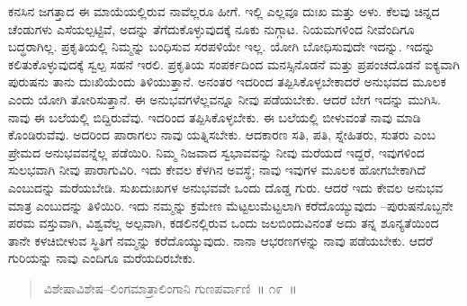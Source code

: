\vspace{0.3cm}

ಕನಸಿನ ಜಗತ್ತಾದ ಈ ಮಾಯೆಯಲ್ಲಿರುವ ನಾವೆಲ್ಲರೂ ಹೀಗೆ. ಇಲ್ಲಿ ಎಲ್ಲವೂ ದುಃಖ ಮತ್ತು ಅಳು. ಕೆಲವು ಚಿನ್ನದ ಚೆಂಡುಗಳು ಎಸೆಯಲ್ಪಟ್ಟಿವೆ, ಅದನ್ನು ತೆಗೆದುಕೊಳ್ಳುವುದಕ್ಕೆ ನೂಕು ನುಗ್ಗಾಟ. ನಿಯಮಗಳಿಂದ ನೀವೆಂದಿಗೂ ಬದ್ಧರಾಗಿಲ್ಲ. ಪ್ರಕೃತಿಯಲ್ಲಿ ನಿಮ್ಮನ್ನು ಬಂಧಿಸುವ ಸರಪಳಿಯೇ ಇಲ್ಲ. ಯೋಗಿ ಬೋಧಿಸುವುದೇ ಇದನ್ನು. ಇದನ್ನು ಕಲಿತುಕೊಳ್ಳುವುದಕ್ಕೆ ಸ್ವಲ್ಪ ಸಹನೆ ಇರಲಿ. ಪ್ರಕೃತಿಯ ಸಂಪರ್ಕದಿಂದ ಮನಸ್ಸಿನೊಡನೆ ಮತ್ತು ಪ್ರಪಂಚದೊಡನೆ ಐಕ್ಯವಾಗಿ ಪುರುಷನು ತಾನು ದುಃಖಿಯೆಂದು ತಿಳಿಯುತ್ತಾನೆ. ಅನಂತರ ಇದರಿಂದ ತಪ್ಪಿಸಿಕೊಳ್ಳಬೇಕಾದರೆ ಅನುಭವದ ಮೂಲಕ ಎಂದು ಯೋಗಿ ತೋರಿಸುತ್ತಾನೆ. ಈ ಅನುಭವಗಳೆಲ್ಲವನ್ನೂ ನೀವು ಪಡೆಯಬೇಕು. ಆದರೆ ಬೇಗ ಇದನ್ನು ಮುಗಿಸಿ. ನಾವು ಈ ಬಲೆಯಲ್ಲಿ ಬಿದ್ದಿರುವೆವು. ಇದರಿಂದ ತಪ್ಪಿಸಿಕೊಳ್ಳಬೇಕು. ಈ ಬಲೆಯಲ್ಲಿ ಬೀಳುವಂತೆ ನಾವು ಮಾಡಿ ಕೊಂಡಿರುವೆವು. ಅದರಿಂದ ಪಾರಾಗಲು ನಾವು ಯತ್ನಿಸಬೇಕು. ಆದಕಾರಣ ಸತಿ, ಪತಿ, ಸ್ನೇಹಿತರು, ಸುತರು ಎಂಬ ಪ್ರೇಮದ ಅನುಭವವನ್ನೆಲ್ಲ ಪಡೆಯಿರಿ. ನಿಮ್ಮ ನಿಜವಾದ ಸ್ವಭಾವವನ್ನು ನೀವು ಮರೆಯದೆ ಇದ್ದರೆ, ಇವುಗಳಿಂದ ಸುಲಭವಾಗಿ ನೀವು ಪಾರಾಗುವಿರಿ. ಇದು ಕೇವಲ ಕೆಳಗಿನ ಅವಸ್ಥೆ; ನಾವು ಇವುಗಳ ಮೂಲಕ ಹೋಗಬೇಕಾಗಿದೆ ಎಂಬುದನ್ನು ಮರೆಯಬೇಡಿ. ಸುಖದುಃಖಗಳ ಅನುಭವವೇ ಒಂದು ದೊಡ್ಡ ಗುರು. ಆದರೆ ಇದು ಕೇವಲ ಅನುಭವ ಮಾತ್ರ ಎಂಬುದನ್ನು ತಿಳಿಯಿರಿ. ಇದು ನಮ್ಮನ್ನು ಕ್ರಮೇಣ ಮೆಟ್ಟಲುಮೆಟ್ಟಲಾಗಿ ಕರೆದೊಯ್ಯುವುದು –ಪುರುಷನೊಬ್ಬನೇ ಪರಮ ವಸ್ತುವಾಗಿ, ವಿಶ್ವವೆಲ್ಲ ಅಲ್ಪವಾಗಿ, ಕಡಲಿನಲ್ಲಿರುವ ಒಂದು ಜಲಬಿಂದುವಿನಂತೆ ಅದು ತನ್ನ ಶೂನ್ಯತೆಯಿಂದ ತಾನೇ ಕಳಚಿಬೀಳುವ ಸ್ಥಿತಿಗೆ ನಮ್ಮನ್ನು ಕರೆದೊಯ್ಯುವುದು. ನಾನಾ ಆಭರಣಗಳನ್ನು ನಾವು ಪಡೆಯಬೇಕು. ಆದರೆ ಗುರಿಯನ್ನು ನಾವು ಎಂದಿಗೂ ಮರೆಯದಿರಬೇಕು. 

\vspace{-0.2cm}

\begin{verse}
ವಿಶೇಷಾವಿಶೇಷ–ಲಿಂಗಮಾತ್ರಾಲಿಂಗಾನಿ ಗುಣಪರ್ವಾಣಿ~॥ ೧೯~॥
\end{verse}

\vspace{-0.4cm}


\newpage

